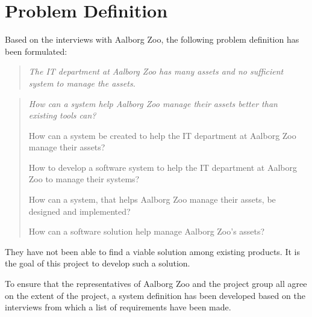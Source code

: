 \section{Problem Definition}
Based on the interviews with Aalborg Zoo, the following problem definition has been formulated:

\begin{quote}
    \textit{The IT department at Aalborg Zoo has many assets and no sufficient system to manage the assets.}
\end{quote}

\begin{quote}
    \textit{How can a system help Aalborg Zoo manage their assets better than existing tools can?}
    
    How can a system be created to help the IT department at Aalborg Zoo manage their assets?
    
    How to develop a software system to help the IT department at Aalborg Zoo to manage their systems?
    
    How can a system, that helps Aalborg Zoo manage their assets, be designed and implemented?
    
    How can a software solution help manage Aalborg Zoo's assets?
\end{quote}

They have not been able to find a viable solution among existing products. It is the goal of this project to develop such a solution. 
\par
To ensure that the representatives of Aalborg Zoo and the project group all agree on the extent of the project, a system definition has been developed based on the interviews from which a list of requirements have been made.